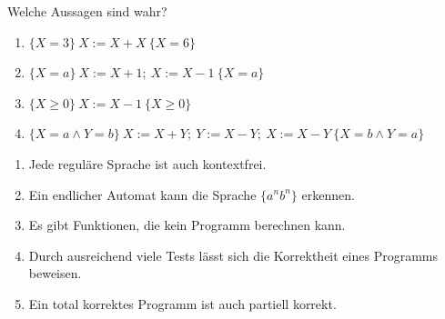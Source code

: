 Welche Aussagen sind wahr?
\begin{enumerate}[label=\alph*)]
\item $\{X = 3\}\ X := X + X\ \{X = 6\}$
\item $\{X = a\}\ X := X + 1;\ X := X - 1\ \{X = a\}$
\item $\{X \geq 0\}\ X := X - 1\ \{X \geq 0\}$
\item $\{X = a \wedge Y = b\}\ X := X + Y;\ Y := X - Y;\ X := X - Y\ \{X = b \wedge Y = a\}$
\end{enumerate}

\begin{enumerate}[label=\alph*)]
\item Jede reguläre Sprache ist auch kontextfrei.
\item Ein endlicher Automat kann die Sprache $\{a^n b^n\}$ erkennen.
\item Es gibt Funktionen, die kein Programm berechnen kann.
\item Durch ausreichend viele Tests lässt sich die Korrektheit eines Programms beweisen.
\item Ein total korrektes Programm ist auch partiell korrekt.
\end{enumerate}
